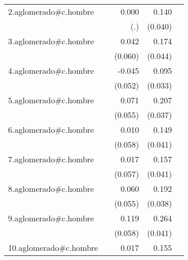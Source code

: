 {\begin{longtable}{l*{4}{D{.}{.}{-1}}}
\addlinespace
2.aglomerado#c.hombre&                     &       0.000         &       0.140\sym{***}&                     \\
            &                     &         (.)         &     (0.040)         &                     \\
\addlinespace
3.aglomerado#c.hombre&                     &       0.042         &       0.174\sym{***}&                     \\
            &                     &     (0.060)         &     (0.044)         &                     \\
\addlinespace
4.aglomerado#c.hombre&                     &      -0.045         &       0.095\sym{**} &                     \\
            &                     &     (0.052)         &     (0.033)         &                     \\
\addlinespace
5.aglomerado#c.hombre&                     &       0.071         &       0.207\sym{***}&                     \\
            &                     &     (0.055)         &     (0.037)         &                     \\
\addlinespace
6.aglomerado#c.hombre&                     &       0.010         &       0.149\sym{***}&                     \\
            &                     &     (0.058)         &     (0.041)         &                     \\
\addlinespace
7.aglomerado#c.hombre&                     &       0.017         &       0.157\sym{***}&                     \\
            &                     &     (0.057)         &     (0.041)         &                     \\
\addlinespace
8.aglomerado#c.hombre&                     &       0.060         &       0.192\sym{***}&                     \\
            &                     &     (0.055)         &     (0.038)         &                     \\
\addlinespace
9.aglomerado#c.hombre&                     &       0.119\sym{*}  &       0.264\sym{***}&                     \\
            &                     &     (0.058)         &     (0.041)         &                     \\
\addlinespace
10.aglomerado#c.hombre&                     &       0.017         &       0.155\sym{***}&                     \\

\end{longtable}}
